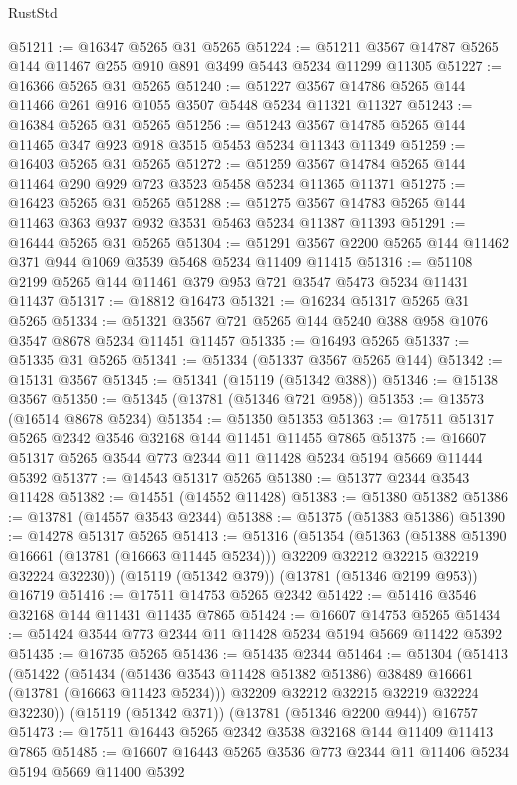 \begin{lexlean}{RustStd}
\begin{coremodule}
@51211 := @16347 @5265 @31 @5265
@51224 := @51211 @3567 @14787 @5265 @144 @11467 @255 @910 @891 @3499 @5443 @5234 @11299 @11305
@51227 := @16366 @5265 @31 @5265
@51240 := @51227 @3567 @14786 @5265 @144 @11466 @261 @916 @1055 @3507 @5448 @5234 @11321 @11327
@51243 := @16384 @5265 @31 @5265
@51256 := @51243 @3567 @14785 @5265 @144 @11465 @347 @923 @918 @3515 @5453 @5234 @11343 @11349
@51259 := @16403 @5265 @31 @5265
@51272 := @51259 @3567 @14784 @5265 @144 @11464 @290 @929 @723 @3523 @5458 @5234 @11365 @11371
@51275 := @16423 @5265 @31 @5265
@51288 := @51275 @3567 @14783 @5265 @144 @11463 @363 @937 @932 @3531 @5463 @5234 @11387 @11393
@51291 := @16444 @5265 @31 @5265
@51304 := @51291 @3567 @2200 @5265 @144 @11462 @371 @944 @1069 @3539 @5468 @5234 @11409 @11415
@51316 := @51108 @2199 @5265 @144 @11461 @379 @953 @721 @3547 @5473 @5234 @11431 @11437
@51317 := @18812 @16473
@51321 := @16234 @51317 @5265 @31 @5265
@51334 := @51321 @3567 @721 @5265 @144 @5240 @388 @958 @1076 @3547 @8678 @5234 @11451 @11457
@51335 := @16493 @5265
@51337 := @51335 @31 @5265
@51341 := @51334 (@51337 @3567 @5265 @144)
@51342 := @15131 @3567
@51345 := @51341 (@15119 (@51342 @388))
@51346 := @15138 @3567
@51350 := @51345 (@13781 (@51346 @721 @958))
@51353 := @13573 (@16514 @8678 @5234)
@51354 := @51350 @51353
@51363 := @17511 @51317 @5265 @2342 @3546 @32168 @144 @11451 @11455 @7865
@51375 := @16607 @51317 @5265 @3544 @773 @2344 @11 @11428 @5234 @5194 @5669 @11444 @5392
@51377 := @14543 @51317 @5265
@51380 := @51377 @2344 @3543 @11428
@51382 := @14551 (@14552 @11428)
@51383 := @51380 @51382
@51386 := @13781 (@14557 @3543 @2344)
@51388 := @51375 (@51383 @51386)
@51390 := @14278 @51317 @5265
@51413 := @51316
    (@51354
      (@51363
        (@51388 @51390 @16661 (@13781 (@16663 @11445 @5234)))
        @32209
        @32212
        @32215
        @32219
        @32224
        @32230))
    (@15119 (@51342 @379))
    (@13781 (@51346 @2199 @953))
    @16719
@51416 := @17511 @14753 @5265 @2342
@51422 := @51416 @3546 @32168 @144 @11431 @11435 @7865
@51424 := @16607 @14753 @5265
@51434 := @51424 @3544 @773 @2344 @11 @11428 @5234 @5194 @5669 @11422 @5392
@51435 := @16735 @5265
@51436 := @51435 @2344
@51464 := @51304
    (@51413
      (@51422
        (@51434 (@51436 @3543 @11428 @51382 @51386) @38489 @16661 (@13781 (@16663 @11423 @5234)))
        @32209
        @32212
        @32215
        @32219
        @32224
        @32230))
    (@15119 (@51342 @371))
    (@13781 (@51346 @2200 @944))
    @16757
@51473 := @17511 @16443 @5265 @2342 @3538 @32168 @144 @11409 @11413 @7865
@51485 := @16607 @16443 @5265 @3536 @773 @2344 @11 @11406 @5234 @5194 @5669 @11400 @5392

\end{coremodule}
\end{lexlean}
